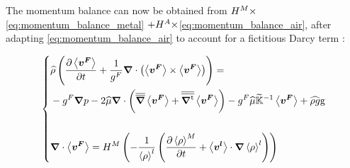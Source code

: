 The momentum balance can now be obtained from $H^M \times$\cref{eq:momentum_balance_metal} $+H^A \times$\cref{eq:momentum_balance_air}, after adapting \cref{eq:momentum_balance_air} to account for a fictitious Darcy term :

\begin{equation}
\label{eq:monolithic_momentum}
   \left\{
   \begin{aligned}
      & \mix{\rho} \brac{\tempup{ \vitf } + \frac{1}{\gf} \nabvec \cdot \brac{\vitf \times \vitf}} = \\
	  &- \gf\nabvec p - 2 \mix{\mu} \nabvec \cdot \brac{\nabmat \vitf+ \nabmattransp \vitf}
	  - \gf \mix{\mu} \Kmodif^{-1} \vitf + \mix{\rho g} \gravity\\ \\
      & \nabvec \cdot \vitf = \heavisideM \brac{-\frac{1}{\rhol} \brac{\tempup{\avg{\rho}^M }+ \vit \cdot  \nabvec \rhol}}
    \end{aligned}
    \right.
\end{equation}

